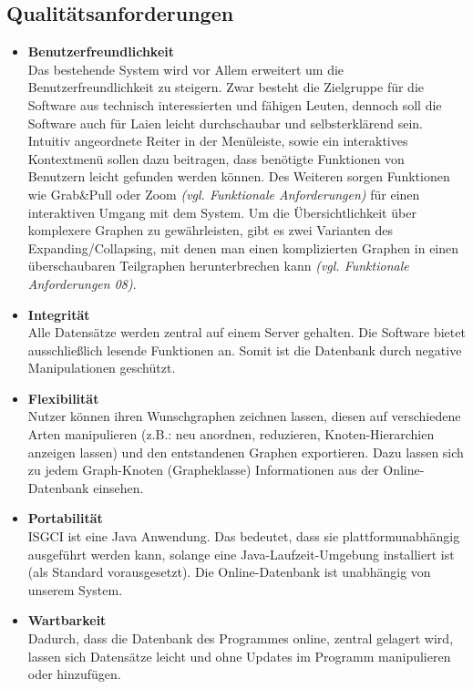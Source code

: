 \documentclass[11pt,a4paper]{article}
\begin{document}
	\subsection{Qualitätsanforderungen} %
		\begin{itemize}	
		\item \textbf{Benutzerfreundlichkeit}\\
		Das bestehende System wird vor Allem erweitert um die Benutzerfreundlichkeit zu steigern. Zwar besteht die Zielgruppe für die Software aus technisch interessierten und fähigen Leuten, dennoch soll die Software auch für Laien leicht durchschaubar und selbsterklärend sein. Intuitiv angeordnete Reiter in der Menüleiste, sowie ein interaktives Kontextmenü sollen dazu beitragen, dass benötigte Funktionen von Benutzern leicht gefunden werden können. Des Weiteren sorgen Funktionen wie Grab\&Pull oder Zoom \textit{(vgl. Funktionale Anforderungen)} für einen interaktiven Umgang mit dem System. Um die Übersichtlichkeit über komplexere Graphen zu gewährleisten, gibt es zwei Varianten des Expanding/Collapsing, mit denen man einen komplizierten Graphen in einen überschaubaren Teilgraphen herunterbrechen kann \textit{(vgl. Funktionale Anforderungen 08)}.
		\item \textbf{Integrität}\\
		Alle Datensätze werden zentral auf einem Server gehalten. Die Software bietet ausschließlich lesende Funktionen an. Somit ist die Datenbank durch negative Manipulationen geschützt.
		\item \textbf{Flexibilität}\\
		Nutzer können ihren Wunschgraphen zeichnen lassen, diesen auf verschiedene Arten manipulieren (z.B.: neu anordnen, reduzieren, Knoten-Hierarchien anzeigen lassen) und den entstandenen Graphen exportieren. Dazu lassen sich zu jedem Graph-Knoten (Grapheklasse) Informationen aus der Online-Datenbank einsehen. 
		\item \textbf{Portabilität}\\
		ISGCI ist eine Java Anwendung. Das bedeutet, dass sie plattformunabhängig ausgeführt werden kann, solange eine Java-Laufzeit-Umgebung installiert ist (als Standard vorausgesetzt).
		Die Online-Datenbank ist unabhängig von unserem System. 
		\item \textbf{Wartbarkeit}\\
		Dadurch, dass die Datenbank des Programmes online, zentral gelagert wird, lassen sich Datensätze leicht und ohne Updates im Programm manipulieren oder hinzufügen.
		\end{itemize}
		
\end{document}
